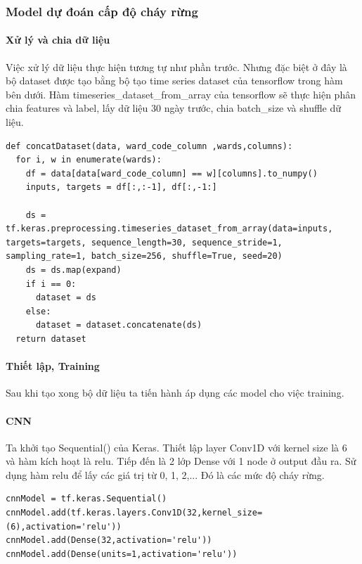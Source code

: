 \documentclass{article}
\begin{document}
\subsubsection{Model dự đoán cấp độ cháy rừng}

\paragraph{Xử lý và chia dữ liệu}
Việc xử lý dữ liệu thực hiện tương tự như phần trước. Nhưng đặc biệt ở đây là bộ dataset được tạo bằng bộ tạo time series dataset của tensorflow trong hàm bên dưới. Hàm timeseries\_dataset\_from\_array của tensorflow sẽ thực hiện phân chia features và label, lấy dữ liệu 30 ngày trước, chia batch\_size và shuffle dữ liệu. 
\begin{verbatim}
def concatDataset(data, ward_code_column ,wards,columns):
  for i, w in enumerate(wards):
    df = data[data[ward_code_column] == w][columns].to_numpy()
    inputs, targets = df[:,:-1], df[:,-1:]
    
    ds = tf.keras.preprocessing.timeseries_dataset_from_array(data=inputs, targets=targets, sequence_length=30, sequence_stride=1, sampling_rate=1, batch_size=256, shuffle=True, seed=20)
    ds = ds.map(expand)
    if i == 0:
      dataset = ds
    else:
      dataset = dataset.concatenate(ds)
  return dataset
\end{verbatim}

\paragraph{Thiết lập, Training}
Sau khi tạo xong bộ dữ liệu ta tiến hành áp dụng các model cho việc training.

\paragraph{CNN}
Ta khởi tạo Sequential() của Keras. Thiết lập layer Conv1D với kernel size là 6 và hàm kích hoạt là relu. Tiếp đến là 2 lớp Dense với 1 node ở output đầu ra. Sử dụng hàm relu để lấy các giá trị từ 0, 1, 2,... Đó là các mức độ cháy rừng.

\begin{verbatim}
cnnModel = tf.keras.Sequential()
cnnModel.add(tf.keras.layers.Conv1D(32,kernel_size=(6),activation='relu'))
cnnModel.add(Dense(32,activation='relu'))
cnnModel.add(Dense(units=1,activation='relu'))
\end{verbatim}
\end{document}
